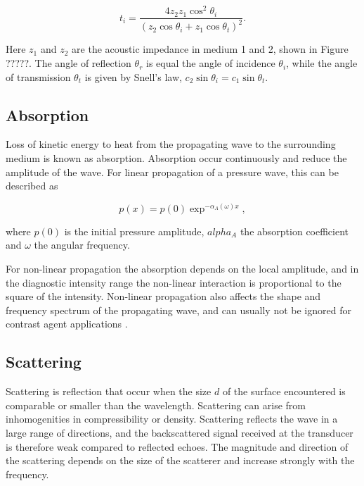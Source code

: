\begin{equation}
\label{fresnel2}
t_i = \frac{4z_2 z_1 \cos^2 \theta_i}{(z_2 \cos \theta_i + z_1 \cos \theta_t)^2}.
\end{equation}

Here $z_1$ and $z_2$ are the acoustic impedance in medium 1 and 2, shown in Figure ?????. The angle of reflection $\theta_r$ is equal the angle of incidence $\theta_i$, while the angle of transmission $\theta_t$ is given by Snell's law\cite{blackstock2000fundamentals}, $ c_2 \sin \theta_i = c_1 \sin \theta_t$. 

\subsection{Absorption}
Loss of kinetic energy to heat from the propagating wave to the surrounding medium is known as absorption. Absorption occur continuously and reduce the amplitude of the wave. For linear propagation of a pressure wave, this can be described as 

\begin{equation}
p(x) = p(0)\exp^{-\alpha_A(\omega)x},
\end{equation} 

where $p(0)$ is the initial pressure amplitude, $alpha_A$ the absorption coefficient and $\omega$ the angular frequency.

For non-linear propagation the absorption depends on the local amplitude, and in the diagnostic intensity range the non-linear interaction is proportional to the square of the intensity\cite{:/content/asa/journal/jasa/97/3/10.1121/1.412091}. Non-linear propagation also affects the shape and frequency spectrum of the propagating wave, and can usually not be ignored for contrast agent applications \cite{Healey2012}. 

 
\subsection{Scattering}
Scattering is reflection that occur when the size $d$ of the surface encountered is comparable or smaller than the wavelength. Scattering can arise from inhomogenities in compressibility or density. Scattering reflects the wave in a large range of directions, and the backscattered signal received at the transducer is therefore weak compared to reflected echoes. The magnitude and direction of the scattering depends on the size of the scatterer and increase strongly with the frequency.  

